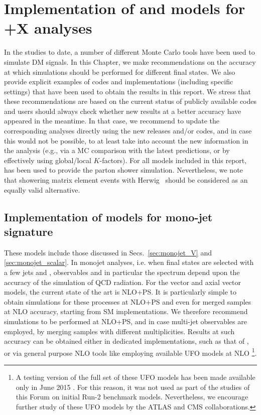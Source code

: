 \section{\texorpdfstring{Implementation of \schannel and \tchannel models for \MET+X analyses}{Implementation of \schannel and \tchannel models for MET+X analyses}}

In the studies to date, a number of different Monte Carlo tools have
been used to simulate DM signals.  In this Chapter, we make recommendations 
on the accuracy at which simulations should be performed for different final states. We 
also provide explicit examples  of codes and implementations (including specific settings) 
that have been used to obtain the results in this report.
We stress that these recommendations are based on the current
status of publicly available codes and users should always check whether new results
at a better accuracy have appeared in the meantime. In that case, we recommend to update
the corresponding analyses  directly using the new releases and/or codes, and in case this would not be possible,
to at least take into account the new information in the analysis (e.g., via a MC comparison with the latest predictions, 
or by effectively using global/local $K$-factors). For all models included in this report, 
\pythiaEight has been used to provide the parton shower simulation. Nevertheless, 
we note that showering matrix element events with Herwig~\cite{Corcella:2000bw} should be considered as 
an equally valid alternative.

\subsection{Implementation of  \schannel  models for mono-jet signature}
\label{sec:monojet_implementation}

These models include those discussed in Secs.~\ref{sec:monojet_V} and \ref{sec:monojet_scalar}.
In monojet analyses, i.e. when final states are selected with a few jets and \MET{}, observables and in particular the \MET{} spectrum depend upon the accuracy of the simulation of QCD radiation.
For the vector and axial vector models, the current state of the art is  NLO+PS. It is particularly simple to obtain simulations for these processes at NLO+PS and even for merged samples at NLO accuracy, starting from SM implementations.  We therefore recommend simulations to be performed at NLO+PS, and in case multi-jet observables are employed,  by merging samples with different multiplicities. 
Results at such accuracy can be obtained either in dedicated implementations, such as that of  \powheg \cite{Haisch:2013ata}, or via general purpose NLO tools like \madgraph employing available UFO models at NLO 
\footnote{A testing version of the full set of these UFO models has been made available
only in June 2015 \cite{NewMadgraphModels}. For this reason, it was not used as part of the studies of this Forum on initial Run-2 benchmark models. Nevertheless, we encourage further study of these UFO models by the ATLAS and CMS collaborations.}.


